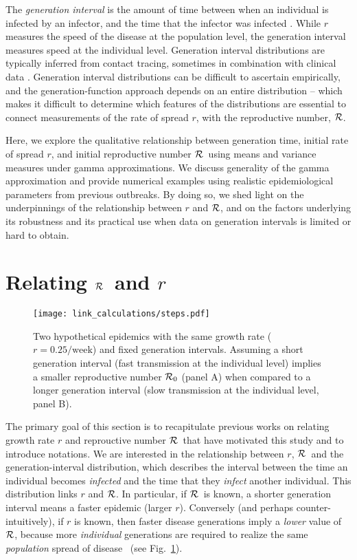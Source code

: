 \documentclass[12pt]{article}
\newcommand{\RR}{\ensuremath{{\cal R}}}
\newcommand{\Rx}[1]{\ensuremath{{\cal R}_{#1}}}
\newcommand{\Ro}{\Rx{0}}
\newcommand{\fref}[1]{Fig.~\ref{fig:#1}}
\begin{document}
The \emph{generation interval} is the amount of time between when an individual is infected by an infector, and the time that the infector was infected \cite{Sven07}.
While $r$ measures the speed of the disease at the population level, the generation interval measures speed at the individual level.
Generation interval distributions are typically inferred from contact tracing, sometimes in combination with clinical data \cite{AylwBarb14,LessOtt16,HubeJohn16}.
Generation interval distributions can be difficult to ascertain empirically, and the generation-function approach depends on an entire distribution -- which makes it difficult to determine which features of the distributions are essential to connect measurements of the rate of spread $r$, with the reproductive number, \RR.

Here, we explore the qualitative relationship between generation time, initial rate of spread $r$, and initial reproductive number \RR\ using means and variance measures under gamma approximations.
We discuss generality of the gamma approximation and provide numerical examples using realistic epidemiological parameters from previous outbreaks.
By doing so, we shed light on the underpinnings of the relationship between $r$ and \RR, and on the factors underlying its robustness and its practical use when data on generation intervals is limited or hard to obtain.


\section{Relating \RR\ and $r$}

\begin{figure}[htbp] \centering
	\texttt{[image: link\_calculations/steps.pdf]}
	\caption{Two hypothetical epidemics with the same growth rate ($r=0.25/\mathrm{week}$) and fixed generation intervals.  Assuming a short generation interval (fast transmission at the individual level) implies a smaller reproductive number $\Ro$ (panel A) when compared to a longer generation interval (slow transmission at the individual level, panel B). 
	\label{fig:link}}
\end{figure}

The primary goal of this section is to recapitulate previous works on relating growth rate $r$ and reprouctive number \RR\ that have motivated this study and
to introduce notations.
We are interested in the relationship between $r$, \RR~and the generation-interval distribution, which describes the interval between the time an individual becomes \emph{infected} and the time that they \emph{infect} another individual.
This distribution links $r$ and \RR. 
In particular, if \RR~is known, a shorter generation interval means a faster epidemic (larger $r$). Conversely (and perhaps counter-intuitively), if $r$ is known, then faster disease generations imply a \emph{lower} value of \RR, because more \emph{individual} generations are required to realize the same \emph{population} spread of disease \cite{EatoHall14,PoweKret14}~(see \fref{link}).
\end{document}
